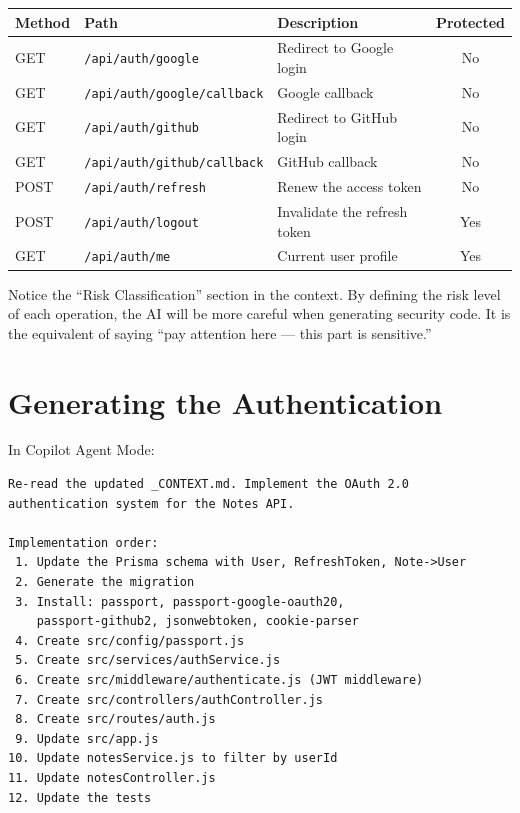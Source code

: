 \begin{center}
\begin{tabularx}{\textwidth}{l l X c}
\toprule
\textbf{Method} & \textbf{Path} & \textbf{Description} & \textbf{Protected} \\
\midrule
GET & \texttt{/api/auth/google} & Redirect to Google login & No \\
GET & \texttt{/api/auth/google/callback} & Google callback & No \\
GET & \texttt{/api/auth/github} & Redirect to GitHub login & No \\
GET & \texttt{/api/auth/github/callback} & GitHub callback & No \\
POST & \texttt{/api/auth/refresh} & Renew the access token & No \\
POST & \texttt{/api/auth/logout} & Invalidate the refresh token & Yes \\
GET & \texttt{/api/auth/me} & Current user profile & Yes \\
\bottomrule
\end{tabularx}
\end{center}

\begin{notebox}
Notice the ``Risk Classification'' section in the context. By defining the risk level of each operation, the AI will be more careful when generating security code. It is the equivalent of saying ``pay attention here --- this part is sensitive.''
\end{notebox}

\section{Generating the Authentication}

\begin{praticabox}[title={Hands-On --- Implementation}]
In Copilot Agent Mode:
\begin{lstlisting}[language={}]
Re-read the updated _CONTEXT.md. Implement the OAuth 2.0
authentication system for the Notes API.

Implementation order:
 1. Update the Prisma schema with User, RefreshToken, Note->User
 2. Generate the migration
 3. Install: passport, passport-google-oauth20,
    passport-github2, jsonwebtoken, cookie-parser
 4. Create src/config/passport.js
 5. Create src/services/authService.js
 6. Create src/middleware/authenticate.js (JWT middleware)
 7. Create src/controllers/authController.js
 8. Create src/routes/auth.js
 9. Update src/app.js
10. Update notesService.js to filter by userId
11. Update notesController.js
12. Update the tests
\end{lstlisting}
\end{praticabox}

